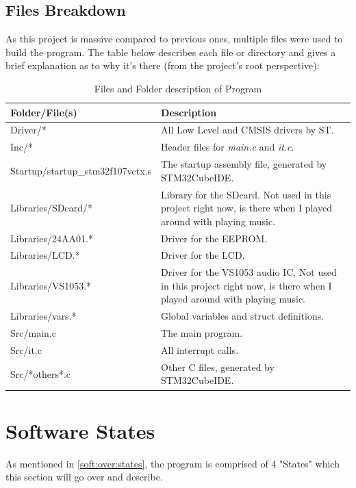 \documentclass[12pt, a4paper]{article}
\begin{document}
    \subsection{Files Breakdown}
    As this project is massive compared to previous ones, multiple files were used to build the program. The table below describes each file or directory and gives a brief explanation as to why it's there (from the project's root perspective):
    \begin{table}[H]\centering\begin{tabularx}{\textwidth}{|l|X|} \hline \rowcolor[HTML]{FFCCC9} 
    \bfseries Folder/File(s) & \bfseries Description \\ \hline
    Driver/*        &   All Low Level and CMSIS drivers by ST.    \\ \hline
    Inc/*        &   Header files for \textit{main.c} and \textit{it.c}.  \\ \hline
    Startup/startup\_stm32f107vctx.s         &   The startup assembly file, generated by STM32CubeIDE.       \\ \hline
    Libraries/SDcard/* & Library for the SDcard. Not used in this project right now, is there when I played around with playing music.    \\ \hline
    Libraries/24AA01.*      & Driver for the EEPROM. \\ \hline
    Libraries/LCD.*      & Driver for the LCD. \\ \hline
    Libraries/VS1053.*      & Driver for the VS1053 audio IC. Not used in this project right now, is there when I played around with playing music.\\ \hline
    Libraries/vars.*      & Global variables and struct definitions. \\ \hline
    Src/main.c      & The main program. \\ \hline
    Src/it.c      & All interrupt calls. \\ \hline
    Src/*others*.c      & Other C files, generated by STM32CubeIDE.       \  \\ \hline
    \end{tabularx}
    \caption{Files and Folder description of Program}
    \end{table}
    
    \section{Software States} \label{sec:states}
    As mentioned in \cref{soft:over:states}, the program is comprised of 4 "States" which this section will go over and describe.
\end{document}

